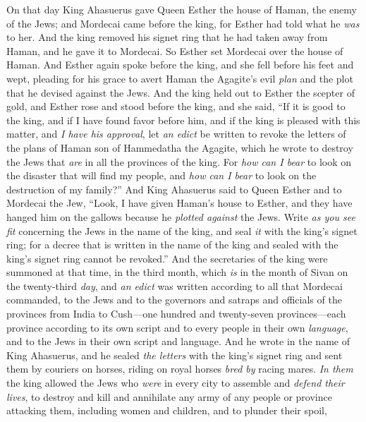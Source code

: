 \begin{biblechapter} %
 On that day King Ahasuerus gave Queen Esther the house of Haman, the enemy of the Jews; and Mordecai came before the king, for Esther had told what he \textit{was} to her.
\verse And the king removed his signet ring that he had taken away from Haman, and he gave it to Mordecai. So Esther set Mordecai over the house of Haman.
\verse And Esther again spoke before the king, and she fell before his feet and wept, pleading for his grace to avert Haman the Agagite’s evil \textit{plan} and the plot that he devised against the Jews.
\verse And the king held out to Esther the scepter of gold, and Esther rose and stood before the king,
\verse and she said, “If it is good to the king, and if I have found favor before him, and if the king is pleased with this matter, and \textit{I have his approval}, let \textit{an edict} be written to revoke the letters of the plans of Haman son of Hammedatha the Agagite, which he wrote to destroy the Jews that \textit{are} in all the provinces of the king.
\verse For \textit{how can I bear} to look on the disaster that will find my people, and \textit{how can I bear} to look on the destruction of my family?”
\verse And King Ahasuerus said to Queen Esther and to Mordecai the Jew, “Look, I have given Haman’s house to Esther, and they have hanged him on the gallows because he \textit{plotted against} the Jews.
\verse Write \textit{as you see fit} concerning the Jews in the name of the king, and seal \textit{it} with the king’s signet ring; for a decree that is written in the name of the king and sealed with the king’s signet ring cannot be revoked.”
\verse And the secretaries of the king were summoned at that time, in the third month, which \textit{is} in the month of Sivan on the twenty-third \textit{day}, and \textit{an edict} was written according to all that Mordecai commanded, to the Jews and to the governors and satraps and officials of the provinces from India to Cush—one hundred and twenty-seven provinces—each province according to its own script and to every people in their own \textit{language}, and to the Jews in their own script and language.
\verse And he wrote in the name of King Ahasuerus, and he sealed \textit{the letters} with the king’s signet ring and sent them by couriers on horses, riding on royal horses \textit{bred by} racing mares.
\verse \textit{In them} the king allowed the Jews who \textit{were} in every city to assemble and \textit{defend their lives}, to destroy and kill and annihilate any army of any people or province attacking them, including women and children, and to plunder their spoil,

\end{biblechapter}
